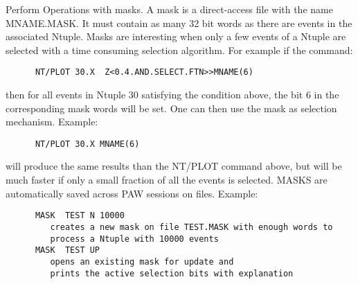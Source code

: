 
\BEGARG
{}
\ENDARG
{}
\ENDOPT

   \par
Perform Operations with masks.  A mask is a direct-access file with the 
   name MNAME.MASK.  It must contain as many 32 bit words as there are events 
   in the associated Ntuple.  Masks are interesting when only a few events of 
   a Ntuple are selected with a time consuming selection algorithm. For 
   example if the command:  
\begin{verbatim}
      NT/PLOT 30.X  Z<0.4.AND.SELECT.FTN>>MNAME(6)
\end{verbatim}
   \par
then for all events in Ntuple 30 satisfying the condition above, the bit 6 
   in the corresponding mask words will be set. One can then use the mask as 
   selection mechanism. Example:  
\begin{verbatim}
      NT/PLOT 30.X MNAME(6)
\end{verbatim}
   \par
will produce the same results than the NT/PLOT command above, but will be 
   much faster if only a small fraction of all the events is selected.  MASKS 
   are automatically saved across PAW sessions on files.  Example:  
\begin{verbatim}
      MASK  TEST N 10000
         creates a new mask on file TEST.MASK with enough words to
         process a Ntuple with 10000 events
      MASK  TEST UP
         opens an existing mask for update and
         prints the active selection bits with explanation
\end{verbatim}

\ENDCMD


